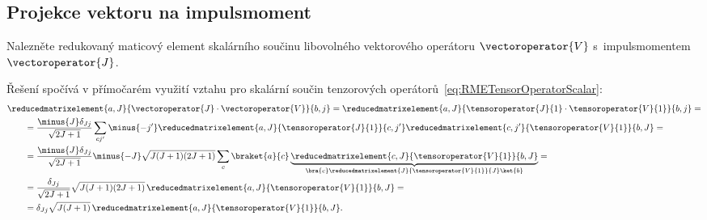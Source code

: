 \subsection{Projekce vektoru na impulsmoment}
	Nalezněte redukovaný maticový element skalárního součinu libovolného vektorového operátoru $\vectoroperator{V}$ s~impulsmomentem $\vectoroperator{J}$.

\begin{solution}
	Řešení spočívá v přímočarém využití vztahu pro skalární součin tenzorových operátorů~\eqref{eq:RMETensorOperatorScalar}:
	\begin{align}
		&\reducedmatrixelement{a,J}{\vectoroperator{J}\cdot\vectoroperator{V}}{b,j}=\reducedmatrixelement{a,J}{\tensoroperator{J}{1}\cdot\tensoroperator{V}{1}}{b,j}=\nonumber\\
		&\qquad=\frac{\minus{J}\delta_{Jj}}{\sqrt{2J+1}}
			\sum_{cj'}\minus{-j'}\reducedmatrixelement{a,J}{\tensoroperator{J}{1}}{c,j'}\reducedmatrixelement{c,j'}{\tensoroperator{V}{1}}{b,J}=\nonumber\\
		&\qquad=\frac{\minus{J}\delta_{Jj}}{\sqrt{2J+1}}\minus{-J}\sqrt{J(J+1)(2J+1)}
			\sum_{c}\braket{a}{c}\underbrace{\reducedmatrixelement{c,J}{\tensoroperator{V}{1}}{b,J}}
			_{\bra{c}\reducedmatrixelement{J}{\tensoroperator{V}{1}}{J}\ket{b}}=\nonumber\\
		&\qquad=\frac{\delta_{Jj}}{\sqrt{2J+1}}\sqrt{J(J+1)(2J+1)}\,\reducedmatrixelement{a,J}{\tensoroperator{V}{1}}{b,J}=\nonumber\\
		&\qquad=\delta_{Jj}\sqrt{J(J+1)}\,\reducedmatrixelement{a,J}{\tensoroperator{V}{1}}{b,J}.
	\end{align}
\end{solution}